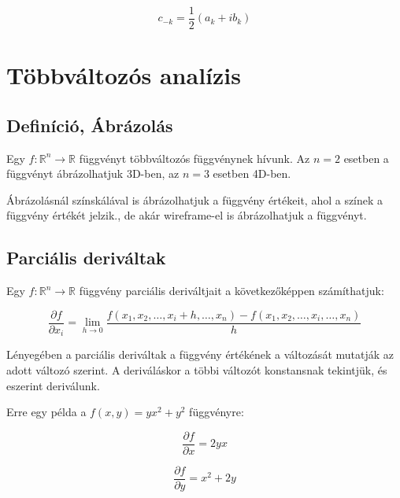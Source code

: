 \documentclass{article}
\begin{document}
\begin{equation*}
    c_{-k} = \frac{1}{2} \left( a_k + ib_k \right)
\end{equation*}

\newpage

\section{Többváltozós analízis}

\subsection{Definíció, Ábrázolás}

Egy $f: \mathbb{R}^n \rightarrow \mathbb{R}$ függvényt többváltozós függvénynek hívunk. Az $n=2$ esetben a függvényt ábrázolhatjuk 3D-ben, az $n=3$ esetben 4D-ben.

Ábrázolásnál színskálával is ábrázolhatjuk a függvény értékeit, ahol a színek a függvény értékét jelzik., de akár wireframe-el is ábrázolhatjuk a függvényt.

\subsection{Parciális deriváltak}

Egy $f: \mathbb{R}^n \rightarrow \mathbb{R}$ függvény parciális deriváltjait a következőképpen számíthatjuk:

\begin{equation*}
    \frac{\partial f}{\partial x_i} = \lim_{h \to 0} \frac{f(x_1, x_2, \ldots, x_i + h, \ldots, x_n) - f(x_1, x_2, \ldots, x_i, \ldots, x_n)}{h}
\end{equation*}

Lényegében a parciális deriváltak a függvény értékének a változását mutatják az adott változó szerint. 
A deriváláskor a többi változót konstansnak tekintjük, és eszerint deriválunk.

\vspace{4mm}

Erre egy példa a $f(x, y) = yx^2 + y^2$ függvényre:

\begin{equation*}
    \frac{\partial f}{\partial x} = 2yx
\end{equation*}

\begin{equation*}
    \frac{\partial f}{\partial y} = x^2 + 2y
\end{equation*}
\end{document}

